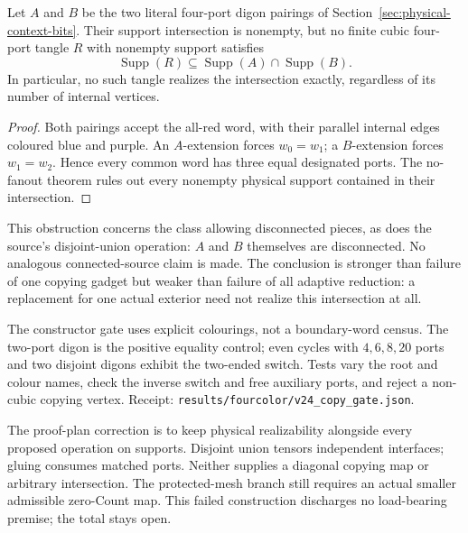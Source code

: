 \begin{theorem}
Let $A$ and $B$ be the two literal four-port digon pairings of
Section~\ref{sec:physical-context-bits}. Their support intersection is
nonempty, but no finite cubic four-port tangle $R$ with nonempty support
satisfies
\[
       \operatorname{Supp}(R)\subseteq
       \operatorname{Supp}(A)\cap\operatorname{Supp}(B).
\]
In particular, no such tangle realizes the intersection exactly, regardless
of its number of internal vertices.
\end{theorem}

\begin{proof}
Both pairings accept the all-red word, with their parallel internal edges
coloured blue and purple. An $A$-extension forces $w_0=w_1$; a
$B$-extension forces $w_1=w_2$. Hence every common word has three equal
designated ports. The no-fanout theorem rules out every nonempty physical
support contained in their intersection.
\end{proof}

This obstruction concerns the class allowing disconnected pieces, as does
the source's disjoint-union operation: $A$ and $B$ themselves are
disconnected. No analogous connected-source claim is made. The conclusion
is stronger than failure of one copying gadget but weaker than failure of
all adaptive reduction: a replacement for one actual exterior need not
realize this intersection at all.

The constructor gate uses explicit colourings, not a boundary-word census.
The two-port digon is the positive equality control; even cycles with
$4,6,8,20$ ports and two disjoint digons exhibit the two-ended switch.
Tests vary the root and colour names, check the inverse switch and free
auxiliary ports, and reject a non-cubic copying vertex. Receipt:
\texttt{results/fourcolor/v24\_copy\_gate.json}.

The proof-plan correction is to keep physical realizability alongside
every proposed operation on supports. Disjoint union tensors independent
interfaces; gluing consumes matched ports. Neither supplies a diagonal
copying map or arbitrary intersection. The protected-mesh branch still
requires an actual smaller admissible zero-Count map. This failed
construction discharges no load-bearing premise; the total stays
open.

